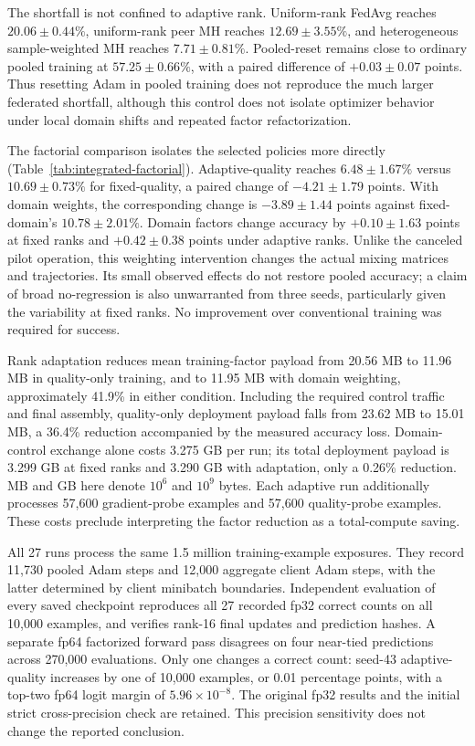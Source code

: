 \documentclass[11pt]{article}
\begin{document}
The shortfall is not confined to adaptive rank. Uniform-rank FedAvg reaches $20.06\pm0.44\%$, uniform-rank peer MH reaches $12.69\pm3.55\%$, and heterogeneous sample-weighted MH reaches $7.71\pm0.81\%$. Pooled-reset remains close to ordinary pooled training at $57.25\pm0.66\%$, with a paired difference of $+0.03\pm0.07$ points. Thus resetting Adam in pooled training does not reproduce the much larger federated shortfall, although this control does not isolate optimizer behavior under local domain shifts and repeated factor refactorization.

The factorial comparison isolates the selected policies more directly (Table~\ref{tab:integrated-factorial}). Adaptive-quality reaches $6.48\pm1.67\%$ versus $10.69\pm0.73\%$ for fixed-quality, a paired change of $-4.21\pm1.79$ points. With domain weights, the corresponding change is $-3.89\pm1.44$ points against fixed-domain's $10.78\pm2.01\%$. Domain factors change accuracy by $+0.10\pm1.63$ points at fixed ranks and $+0.42\pm0.38$ points under adaptive ranks. Unlike the canceled pilot operation, this weighting intervention changes the actual mixing matrices and trajectories. Its small observed effects do not restore pooled accuracy; a claim of broad no-regression is also unwarranted from three seeds, particularly given the variability at fixed ranks. No improvement over conventional training was required for success.

Rank adaptation reduces mean training-factor payload from 20.56 MB to 11.96 MB in quality-only training, and to 11.95 MB with domain weighting, approximately 41.9\% in either condition. Including the required control traffic and final assembly, quality-only deployment payload falls from 23.62 MB to 15.01 MB, a 36.4\% reduction accompanied by the measured accuracy loss. Domain-control exchange alone costs 3.275 GB per run; its total deployment payload is 3.299 GB at fixed ranks and 3.290 GB with adaptation, only a 0.26\% reduction. MB and GB here denote $10^6$ and $10^9$ bytes. Each adaptive run additionally processes 57,600 gradient-probe examples and 57,600 quality-probe examples. These costs preclude interpreting the factor reduction as a total-compute saving.

All 27 runs process the same 1.5 million training-example exposures. They record 11,730 pooled Adam steps and 12,000 aggregate client Adam steps, with the latter determined by client minibatch boundaries. Independent evaluation of every saved checkpoint reproduces all 27 recorded fp32 correct counts on all 10,000 examples, and verifies rank-16 final updates and prediction hashes. A separate fp64 factorized forward pass disagrees on four near-tied predictions across 270,000 evaluations. Only one changes a correct count: seed-43 adaptive-quality increases by one of 10,000 examples, or 0.01 percentage points, with a top-two fp64 logit margin of $5.96\times10^{-8}$. The original fp32 results and the initial strict cross-precision check are retained. This precision sensitivity does not change the reported conclusion.
\end{document}
